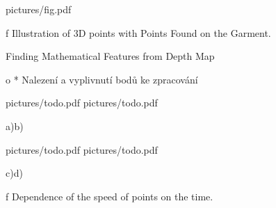 \medskip {}
\picw=18cm
\cinspic pictures/fig.pdf
\caption/f Illustration of 3D points with Points Found on the Garment.
\medskip

\secc Finding Mathematical Features from Depth Map

		\Green
		\begitems \style o
			* Nalezení a vyplivnutí bodů ke zpracování
		\enditems

\lorem
\lorem
\lorem
\lorem
\lorem
\lorem

\medskip {}
\picw=7cm 
\centerline {\inspic pictures/todo.pdf \hfil\hfil \inspic pictures/todo.pdf }\nobreak
\centerline {a)\hfil\hfil b)}\nobreak\medskip
\centerline {\inspic pictures/todo.pdf \hfil\hfil \inspic pictures/todo.pdf }\nobreak
\centerline {c)\hfil\hfil d)}\nobreak\medskip
\caption/f Dependence of the speed of points on the time.
\medskip
